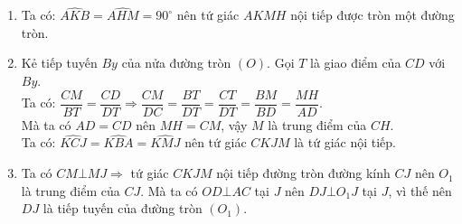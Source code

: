 \begin{bt}
{\begin{center}
\end{center}
	\begin{enumerate}
    		\item Ta có: $\widehat{AKB}=\widehat{AHM}=90^\circ$ nên tứ giác $AKMH$ nội tiếp được tròn một đường tròn.
    		\item Kẻ tiếp tuyến $By$ của nửa đường tròn $(O)$. Gọi $T$ là giao điểm của $CD$ với $By$.\\
    		Ta có: $\dfrac{CM}{BT}=\dfrac{CD}{DT}\Rightarrow \dfrac{CM}{DC}=\dfrac{BT}{DT}=\dfrac{CT}{DT}=\dfrac{BM}{BD}=\dfrac{MH}{AD}$.\\
    		Mà ta có $AD=CD$ nên $MH=CM$, vậy $M$ là trung điểm của $CH$.\\
    		Ta có: $\widehat{KCJ}=\widehat{KBA}=\widehat{KMJ}$ nên tứ giác $CKJM$ là tứ giác nội tiếp.
    		\item Ta có $CM\bot MJ\Rightarrow$ tứ giác $CKJM$ nội tiếp đường tròn đường kính $CJ$ nên $O_1$ là trung điểm của $CJ$. 	Mà ta có $OD\bot AC$ tại $J$ nên $DJ\bot O_1J$ tại $J$, vì thế nên $DJ$ là tiếp tuyến của đường tròn $(O_1)$.
    	\end{enumerate}}
    \end{bt}
    
